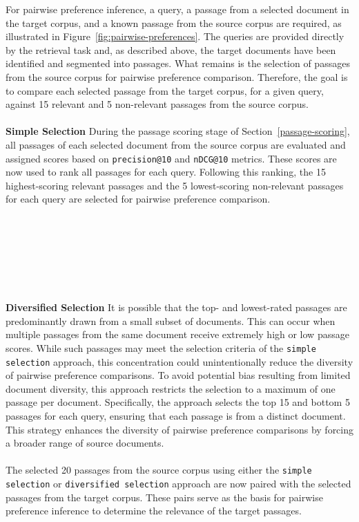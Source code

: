 For pairwise preference inference, a query, a passage from a selected document in the target corpus, and a known passage from the source corpus are required, as illustrated in Figure~\ref{fig:pairwise-preferences}. The queries are provided directly by the retrieval task and, as described above, the target documents have been identified and segmented into passages. What remains is the selection of passages from the source corpus for pairwise preference comparison. Therefore, the goal is to compare each selected passage from the target corpus, for a given query, against 15 relevant and 5 non-relevant passages from the source corpus.
\\\\
\textbf{Simple Selection} During the passage scoring stage of Section~\ref{passage-scoring}, all passages of each selected document from the source corpus are evaluated and assigned scores based on \texttt{precision@10} and \texttt{nDCG@10} metrics. These scores are now used to rank all passages for each query. Following this ranking, the 15 highest-scoring relevant passages and the 5 lowest-scoring non-relevant passages for each query are selected for pairwise preference comparison.
\\\\\\\\\\\\\\\\
\textbf{Diversified Selection} It is possible that the top- and lowest-rated passages are predominantly drawn from a small subset of documents. This can occur when multiple passages from the same document receive extremely high or low passage scores. While such passages may meet the selection criteria of the \texttt{simple selection} approach, this concentration could unintentionally reduce the diversity of pairwise preference comparisons. To avoid potential bias resulting from limited document diversity, this approach restricts the selection to a maximum of one passage per document. Specifically, the approach selects the top 15 and bottom 5 passages for each query, ensuring that each passage is from a distinct document. This strategy enhances the diversity of pairwise preference comparisons by forcing a broader range of source documents.
\\\\
The selected 20 passages from the source corpus using either the \texttt{simple selection} or \texttt{diversified selection} approach are now paired with the selected passages from the target corpus. These pairs serve as the basis for pairwise preference inference to determine the relevance of the target passages.

